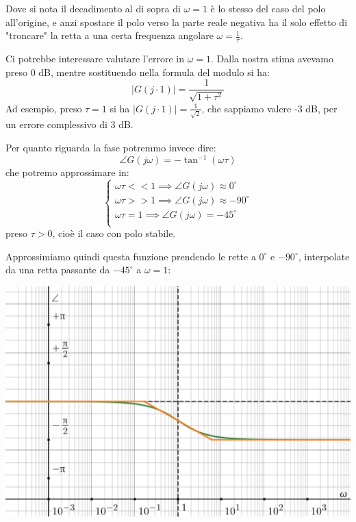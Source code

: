 \documentclass[a4paper,11pt]{article}
\begin{document}
\par\bigskip

Dove si nota il decadimento al di sopra di $\omega = 1$ è lo stesso del caso del polo all'origine, e anzi spostare il polo verso la parte reale negativa ha il solo effetto di "troncare" la retta a una certa frequenza angolare $\omega= \frac{1}{\tau}$.

\par\smallskip

Ci potrebbe interessare valutare l'errore in $\omega = 1$.
Dalla nostra stima avevamo preso 0 dB, mentre sostituendo nella formula del modulo si ha:
$$
|G(j \cdot 1)| = \frac{1}{\sqrt{1 + \tau^2}}
$$
Ad esempio, preso $\tau = 1$ si ha $|G(j \cdot 1)| = \frac{1}{\sqrt{2}}$, che sappiamo valere -3 dB, per un errore complessivo di 3 dB.

\par\smallskip

Per quanto riguarda la fase potremmo invece dire:
$$
\angle G(j \omega) = - \tan^{-1} \left( \omega \tau \right)
$$
che potremo approssimare in:
\[
	\begin{cases}
		\omega \tau << 1 \implies \angle G(j\omega) \approx 0^\circ \\ 	
		\omega \tau >> 1 \implies \angle G(j\omega) \approx -90^\circ \\ 	
		\omega \tau = 1 \implies \angle G(j\omega) = -45^\circ \\ 	
	\end{cases}
\]
preso $\tau > 0$, cioè il caso con polo stabile.

\par\bigskip

\noindent
\begin{minipage}{\textwidth}
Approssimiamo quindi questa funzione prendendo le rette a $0^\circ$ e $-90^\circ$, interpolate da una retta passante da $-45^\circ$ a $\omega = 1$:
\begin{center}
	\includegraphics[scale=0.3]{../figures/lowpass_bode/phase.png}
\end{center}
\end{minipage}
\end{document}
